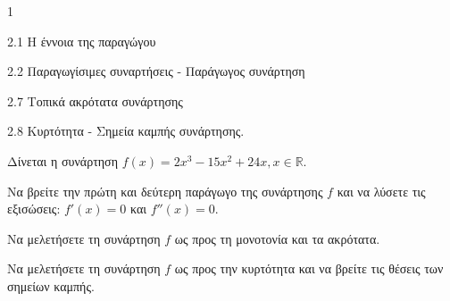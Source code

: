 \begin{ylh}{1}
    \item 2.1 Η έννοια της παραγώγου
    \item 2.2 Παραγωγίσιμες συναρτήσεις - Παράγωγος συνάρτηση
    \item 2.7 Τοπικά ακρότατα συνάρτησης
    \item 2.8 Κυρτότητα - Σημεία καμπής συνάρτησης.
\end{ylh}
Δίνεται η συνάρτηση $f(x)=2x^3-15x^2+24x, x \in \mathbb{R}$.
\begin{alist}
\item Να βρείτε την πρώτη και δεύτερη παράγωγο της συνάρτησης $f$ και να λύσετε τις εξισώσεις: $f'(x)=0$ και $f''(x)=0$.  
\item Να μελετήσετε τη συνάρτηση $f$ ως προς τη μονοτονία και τα ακρότατα.  
\item Να μελετήσετε τη συνάρτηση $f$ ως προς την κυρτότητα και να βρείτε τις θέσεις των σημείων καμπής.  
\end{alist}